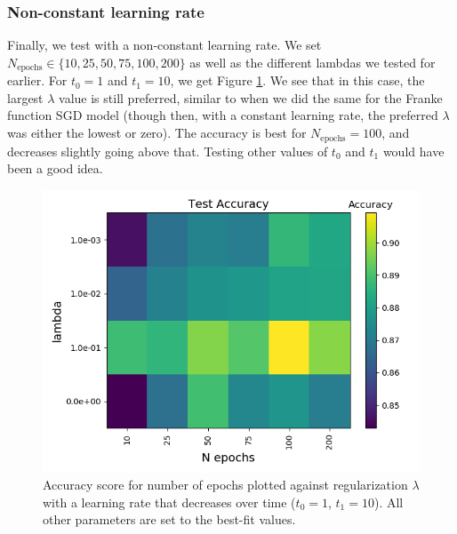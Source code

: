 \documentclass[a4paper]{article}
\newcommand{\Nepochs}{N_{\text{epochs}}}
\begin{document}
\subsubsection*{Non-constant learning rate}
Finally, we test with a non-constant learning rate. We set $\Nepochs \in \{10, 25, 50, 75, 100, 200\}$ as well as the different lambdas we tested for earlier. For $t_0 = 1$ and $t_1 = 10$, we get Figure \ref{fig:sgd_mnist2}. We see that in this case, the largest $\lambda$ value is still preferred, similar to when we did the same for the Franke function SGD model (though then, with a constant learning rate, the preferred $\lambda$ was either the lowest or zero). The accuracy is best for $\Nepochs= 100$, and decreases slightly going above that. Testing other values of $t_0$ and $t_1$ would have been a good idea.
\begin{figure}[H]
	\centering
	\includegraphics[scale=0.5]{../figures/task_e/non_constant_lr/heatmap_non_constant_lr_lr_optimal_Nhyp6114_Accuracy_n_epochs_lambdas.png}
	\caption{Accuracy score for number of epochs plotted against regularization $\lambda$ with a learning rate that decreases over time ($t_0 = 1$, $t_1=10$). All other parameters are set to the best-fit values.}
	\label{fig:sgd_mnist2}
\end{figure}
\end{document}
